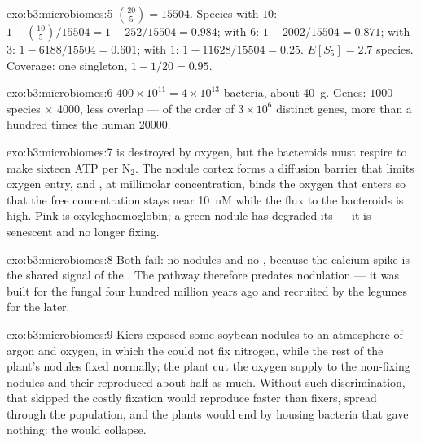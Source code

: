 \begin{solution}{exo:b3:microbiomes:5}
$\binom{20}{5} = \num{15504}$. Species with $10$: $1 - \binom{10}{5}/
\num{15504} = 1 - 252/\num{15504} = 0.984$; with $6$: $1 - 2002/\num{15504}
= 0.871$; with $3$: $1 - 6188/\num{15504} = 0.601$; with $1$: $1 -
\num{11628}/\num{15504} = 0.25$. $E[S_{5}] = 2.7$ species. Coverage: one
singleton, $1 - 1/20 = 0.95$.
\end{solution}

\begin{solution}{exo:b3:microbiomes:6}
$400\times 10^{11} = 4\times 10^{13}$ bacteria, about \qty{40}{g}. Genes:
$1000$ species $\times$ \num{4000}, less overlap --- of the order of
$3\times 10^{6}$ distinct genes, more than a hundred times the human
\num{20000}.
\end{solution}

\begin{solution}{exo:b3:microbiomes:7}
 is destroyed by oxygen, but the bacteroids must respire
to make sixteen ATP per N$_{2}$. The nodule cortex forms a diffusion
barrier that limits oxygen entry, and , at millimolar
concentration, binds the oxygen that enters so that the free
concentration stays near \qty{10}{nM} while the flux to the bacteroids
is high. Pink is oxyleghaemoglobin; a green nodule has degraded its
 --- it is senescent and no longer fixing.
\end{solution}

\begin{solution}{exo:b3:microbiomes:8}
Both fail: no nodules and no , because the
calcium spike is the shared signal of the .
The pathway therefore predates nodulation --- it was built for the
fungal  four hundred million years ago and recruited by the
legumes for the  later.
\end{solution}

\begin{solution}{exo:b3:microbiomes:9}
Kiers exposed some soybean nodules to an atmosphere of argon and
oxygen, in which the  could not fix nitrogen, while the rest of
the plant's nodules fixed normally; the plant cut the oxygen supply to
the non-fixing nodules and their  reproduced about half as
much. Without such discrimination,  that skipped the costly
fixation would reproduce faster than fixers, spread through the
population, and the plants would end by housing bacteria that gave
nothing: the  would collapse.
\end{solution}

